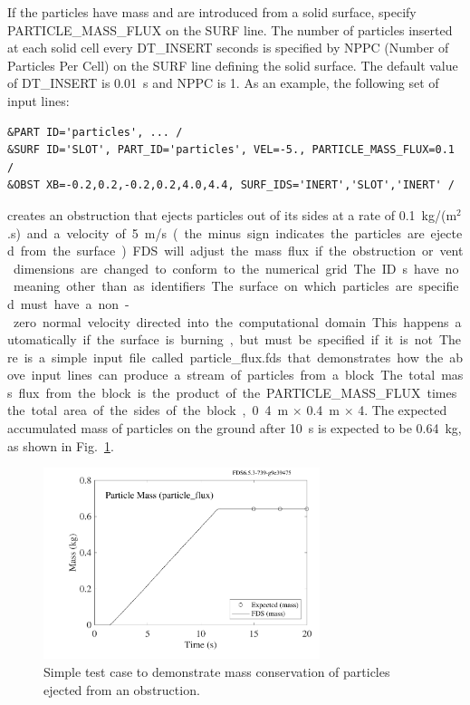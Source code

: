 \documentclass[11pt]{book}
\begin{document}
If the particles have mass and are introduced from a solid surface, specify {\ct PARTICLE\_MASS\_FLUX} on the {\ct SURF} line. The number of particles inserted at each solid cell every {\ct DT\_INSERT} seconds is specified by {\ct NPPC} (Number of Particles Per Cell) on the {\ct SURF} line defining the solid surface. The default value of {\ct DT\_INSERT} is 0.01~s and {\ct NPPC} is 1. As an example, the following set of input lines:
\begin{lstlisting}
&PART ID='particles', ... /
&SURF ID='SLOT', PART_ID='particles', VEL=-5., PARTICLE_MASS_FLUX=0.1 /
&OBST XB=-0.2,0.2,-0.2,0.2,4.0,4.4, SURF_IDS='INERT','SLOT','INERT' /
\end{lstlisting}
creates an obstruction that ejects particles out of its sides at a rate of 0.1~\si{kg/(m$^2$.s)} and a velocity of 5~m/s (the minus sign indicates the particles are ejected from the surface). FDS will adjust the mass flux if the obstruction or vent dimensions are changed to conform to the numerical grid. The {\ct ID}s have no meaning other than as identifiers. The surface on which particles are specified must have a non-zero normal velocity directed into the computational domain. This happens automatically if the surface is burning, but must be specified if it is not. There is a simple input file called {\ct particle\_flux.fds} that demonstrates how the above input lines can produce a stream of particles from a block. The total mass flux from the block is the product of the {\ct PARTICLE\_MASS\_FLUX} times the total area of the sides of the block, 0.4~m $\times$ 0.4~m $\times$ 4. The expected accumulated mass of particles on the ground after 10~s is expected to be 0.64~kg, as shown in Fig.~\ref{particle_flux}.

\begin{figure}[ht]
\begin{center}
\includegraphics[height=2.2in]{SCRIPT_FIGURES/particle_flux}
\end{center}
\caption[Results of the {\ct particle\_flux} test case]{Simple test case to demonstrate mass conservation of particles ejected from an obstruction.}
\label{particle_flux}
\end{figure}
\end{document}
